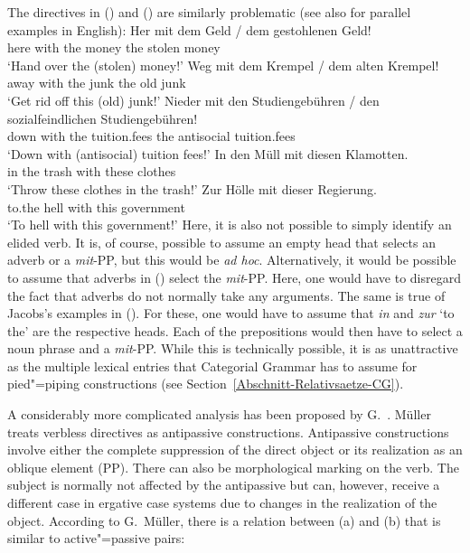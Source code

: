 \begin{exe}
\begin{xlist}[iv.]
\begin{exe}
\begin{xlist}[iv.]
The directives in () and () are similarly problematic (see also  for parallel examples in English):
\eal
\label{Beispiel-Direktiva}
\ex 
\gll Her  mit  dem Geld   / dem gestohlenen Geld!\\
     here with the money {} the stolen money\\
\glt `Hand over the (stolen) money!'
\ex 
\gll Weg  mit  dem Krempel / dem alten Krempel!\\
     away with the junk   {} the old junk\\
\glt `Get rid off this (old) junk!'
\ex 
\gll Nieder mit den Studiengebühren / den sozialfeindlichen Studiengebühren!\\
     down with the tuition.fees  {} the antisocial tuition.fees\\
\glt `Down with (antisocial) tuition fees!'
\zl
\eal
\ex 
\gll In den Müll mit diesen Klamotten.\\
     in the trash with these clothes\\
\glt `Throw these clothes in the trash!'
\ex 
\gll Zur Hölle mit dieser Regierung.\\
	 to.the hell with this government\\
\glt `To hell with this government!'
\zl
Here, it is also not possible to simply identify an
elided verb. It is, of course, possible to assume an empty head that selects an adverb or a 
\emph{mit}-PP, but this would be \emph{ad hoc}.
Alternatively, it would be possible to assume that adverbs in () select the \emph{mit}-PP. Here, one would have to disregard the fact that adverbs
do not normally take any arguments. The same is true of Jacobs's examples in (). For these,
one would have to assume that \emph{in} and \emph{zur} `to the' are the respective heads. Each of
the prepositions would then have to select a noun phrase and a \emph{mit}-PP. While this is technically possible, it is as unattractive
as the multiple lexical entries that Categorial Grammar has to assume for pied"=piping constructions (see Section~\ref{Abschnitt-Relativsaetze-CG}). 

A considerably more complicated analysis has been proposed by G.\ \citet{GMueller2009a}. Müller treats verbless directives as antipassive constructions. 
Antipassive constructions involve either the complete suppression of the direct object or its realization as an oblique element (PP). There
can also be morphological marking on the verb. The subject is normally not affected by the antipassive but can, however, receive a different case
in ergative case systems due to changes in the realization of the object. According to
G.\ Müller, there is a relation between (a) and (b) that is similar to active"=passive pairs:


\end{xlist}
\end{exe}
\end{xlist}
\end{exe}
